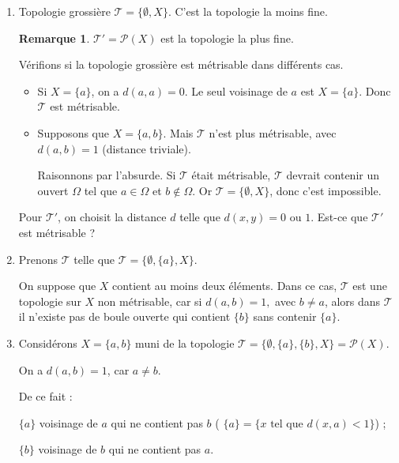 \documentclass[french]{book}
\theoremstyle{definition}
\newtheorem*{protoremark}{Remarque}
\newenvironment{remark}
    {\colorlet{shadecolor}{yellow!5}\begin{shaded}\begin{protoremark}}
    {\end{protoremark}\end{shaded}}
\newcommand{\lesss}{<}
\newcommand{\less}{\lesss}
\begin{document}
\begin{enumerate}
  \item Topologie grossière $\mathscr{T}= \{ \emptyset, X \} $. C'est la topologie la moins fine.

  \begin{remark}
    $\mathscr{T}' = \mathscr{P}(X)  $ est la topologie la plus fine.
  \end{remark}

  Vérifions si la topologie grossière est métrisable dans différents cas.
  \begin{itemize}
    \item Si $X = \{ a \} $, on a $d(a,a) =0$. Le seul voisinage de $a$ est $X = \{ a \} $. Donc $\mathscr{T} $ est métrisable.
    \item Supposons que $X = \{ a,b \} $. Mais $\mathscr{T} $ n'est plus métrisable, avec $d(a,b) =1$ (distance triviale).

    Raisonnons par l'absurde. Si $\mathscr{T} $ était métrisable, $\mathscr{T} $ devrait contenir un ouvert $\Omega$ tel que $a \in \Omega$ et $b \notin \Omega$. Or $\mathscr{T} = \{ \emptyset, X \} $, donc c'est impossible.
  \end{itemize}

  Pour $\mathscr{T}' $, on choisit la distance $d$ telle que $d(x,y) = 0 \text{ ou } 1$. Est-ce que $\mathscr{T}' $ est métrisable ?

  \item Prenons $\mathscr{T} $ telle que $\mathscr{T} = \{ \emptyset, \{ a \} , X \} $.

  On suppose que $X$ contient au moins deux éléments. Dans ce cas, $\mathscr{T} $ est une topologie sur $X$ non métrisable, car si $d(a,b)=1,$ avec $ b \neq a$, alors dans $\mathscr{T} $ il n'existe pas de boule ouverte qui contient $\{ b \} $ sans contenir $\{ a \} $.

  \item Considérons $X = \{ a,b \}$ muni de la topologie $  \mathscr{T} = \{ \emptyset, \{ a \}, \{ b \}, X \} = \mathscr{P}(X)  $.

  On a $d(a,b) = 1$, car $a \neq b$.

  De ce fait :

  $\{ a \} $ voisinage de $a$ qui ne contient pas $b$ ( $\{ a \} = \{ x \text{ tel que } d(x,a) \less 1 \} $) ;

  $\{ b \} $ voisinage de $b$ qui ne contient pas $a$.




\end{enumerate}
\end{document}
